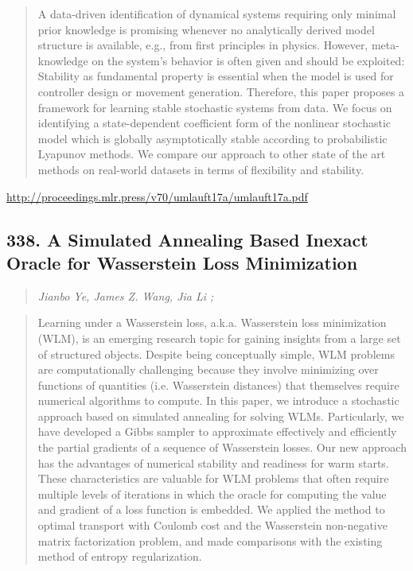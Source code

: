 \documentclass{article}
\begin{document}
\begin{quote}
    A data-driven identification of dynamical systems requiring only minimal prior knowledge is promising whenever no analytically derived model structure is available, e.g., from first principles in physics. However, meta-knowledge on the system’s behavior is often given and should be exploited: Stability as fundamental property is essential when the model is used for controller design or movement generation. Therefore, this paper proposes a framework for learning stable stochastic systems from data. We focus on identifying a state-dependent coefficient form of the nonlinear stochastic model which is globally asymptotically stable according to probabilistic Lyapunov methods. We compare our approach to other state of the art methods on real-world datasets in terms of flexibility and stability.  
\end{quote}

\href{http://proceedings.mlr.press/v70/umlauft17a/umlauft17a.pdf}{http://proceedings.mlr.press/v70/umlauft17a/umlauft17a.pdf}

\subsection{338. A Simulated Annealing Based Inexact Oracle for Wasserstein Loss Minimization}

\begin{quote}
\footnotesize{\textit{Jianbo Ye, James Z. Wang, Jia Li ;}}

\end{quote}

\begin{quote}
    Learning under a Wasserstein loss, a.k.a. Wasserstein loss minimization (WLM), is an emerging research topic for gaining insights from a large set of structured objects. Despite being conceptually simple, WLM problems are computationally challenging because they involve minimizing over functions of quantities (i.e. Wasserstein distances) that themselves require numerical algorithms to compute. In this paper, we introduce a stochastic approach based on simulated annealing for solving WLMs. Particularly, we have developed a Gibbs sampler to approximate effectively and efficiently the partial gradients of a sequence of Wasserstein losses. Our new approach has the advantages of numerical stability and readiness for warm starts. These characteristics are valuable for WLM problems that often require multiple levels of iterations in which the oracle for computing the value and gradient of a loss function is embedded. We applied the method to optimal transport with Coulomb cost and the Wasserstein non-negative matrix factorization problem, and made comparisons with the existing method of entropy regularization.  
\end{quote}
\end{document}
